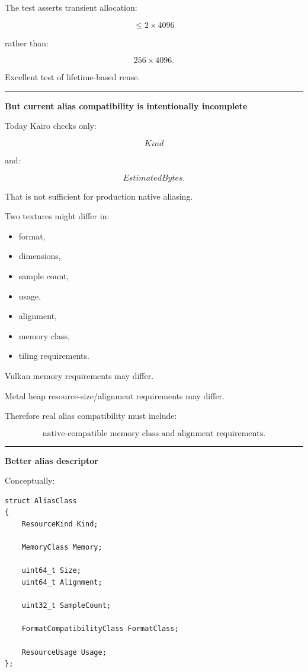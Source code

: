 The test asserts transient allocation:

\[
\le
2\times4096
\]

rather than:

\[
256\times4096.
\]

Excellent test of lifetime-based reuse.

\begin{center}\rule{0.5\linewidth}{0.5pt}\end{center}

\textbf{But current alias compatibility is intentionally incomplete}

Today Kairo checks only:

\[
Kind
\]

and:

\[
EstimatedBytes.
\]

That is not sufficient for production native aliasing.

Two textures might differ in:

\begin{itemize}
\tightlist
\item
  format,
\item
  dimensions,
\item
  sample count,
\item
  usage,
\item
  alignment,
\item
  memory class,
\item
  tiling requirements.
\end{itemize}

Vulkan memory requirements may differ.

Metal heap resource-size/alignment requirements may differ.

Therefore real alias compatibility must include:

\[
\boxed{
\text{native-compatible memory class and alignment requirements}.
}
\]

\begin{center}\rule{0.5\linewidth}{0.5pt}\end{center}

\textbf{Better alias descriptor}

Conceptually:

\begin{verbatim}
struct AliasClass
{
    ResourceKind Kind;

    MemoryClass Memory;

    uint64_t Size;
    uint64_t Alignment;

    uint32_t SampleCount;

    FormatCompatibilityClass FormatClass;

    ResourceUsage Usage;
};
\end{verbatim}


